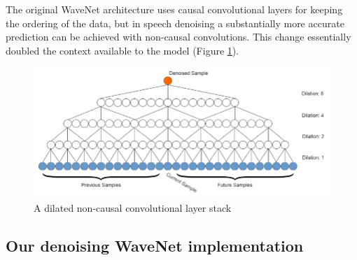 \documentclass{article}
\begin{document}
	The original WaveNet architecture uses causal convolutional layers for keeping the ordering of the data, but in speech denoising a substantially more accurate prediction can be achieved with non-causal convolutions. This change essentially doubled the context available to the model (Figure \ref{fig:dnccs}).
	
	
	\begin{figure}[H]
		\centering
		\includegraphics[width=.9\linewidth]{dnccs.png}
		\caption{A dilated non-causal convolutional layer stack}
		\label{fig:dnccs}
	\end{figure}
	
	
	\subsection{Our denoising WaveNet implementation}
	\label{sec:own_wavenet}

	
	
\end{document}
